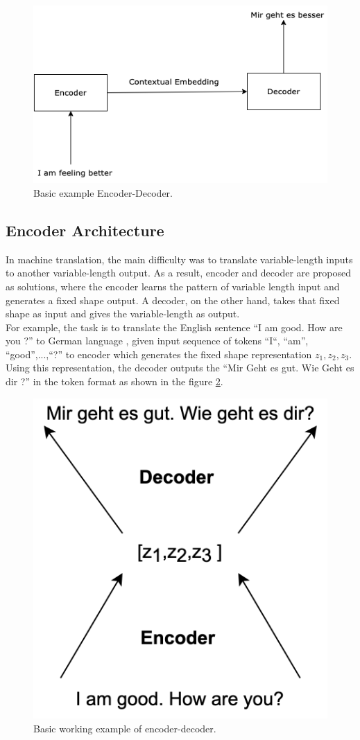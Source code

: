 \documentclass[%
	BCOR=8mm, %
	DIV=12,
	toc=bibliography, %
	toc=listof, %
	oneside, %
	egregdoesnotlikesansseriftitles, %
	]{scrbook}
\begin{document}
\begin{figure}[h!]
\centering
\includegraphics[width=.50\textwidth]{img/encoderDecoder.png}
\caption[Basic example of encoder and decoder]{Basic example Encoder-Decoder.}
\label{diag:EncoderDecoder}
\end{figure}

\subsection{Encoder Architecture}
In machine translation, the main difficulty was to translate variable-length inputs to another variable-length output. As a result, encoder and decoder are proposed as solutions, where the encoder learns the pattern of variable length input and generates a fixed shape output. A decoder, on the other hand, takes that fixed shape as input and gives the variable-length as output. \\
For example, the task is to translate the English sentence ``I am good. How are you ?'' to German language , given input sequence of tokens ``I``, ``am'', ``good'',...,``?'' to encoder which generates the fixed shape representation $z_{1},z_{2},z_{3}$. Using this representation, the decoder outputs the ``Mir Geht es gut. Wie Geht es dir ?'' in the token format as shown in the figure \ref{diag:EncoderDecoderExp}.\\
\begin{figure}[H]
    \centering
    \includegraphics[width=.30\textwidth]{img/EncoderDecoder2.png}
    \caption[Basic example of encoder and decoder working]{Basic working example of encoder-decoder.}
    \label{diag:EncoderDecoderExp}
\end{figure}
\end{document}
